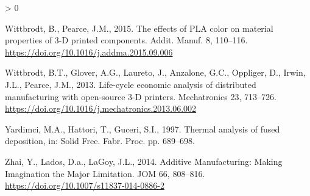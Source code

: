 \documentclass[
]{article}
\newlength{\cslhangindent}
\newenvironment{CSLReferences}[2] %
 {%
  \setlength{\parindent}{0pt}
  \ifodd #1 \everypar{\setlength{\hangindent}{\cslhangindent}}\ignorespaces\fi
  \ifnum #2 > 0
  \setlength{\parskip}{#2\baselineskip}
  \fi
 }%
 {}
\begin{document}
\begin{CSLReferences}{1}{0}
\leavevmode\hypertarget{ref-Wittbrodt2015}{}%
Wittbrodt, B., Pearce, J.M., 2015. {The effects of PLA color on material properties of 3-D printed components}. Addit. Manuf. 8, 110--116. \url{https://doi.org/10.1016/j.addma.2015.09.006}

\leavevmode\hypertarget{ref-Wittbrodt2013}{}%
Wittbrodt, B.T., Glover, A.G., Laureto, J., Anzalone, G.C., Oppliger, D., Irwin, J.L., Pearce, J.M., 2013. {Life-cycle economic analysis of distributed manufacturing with open-source 3-D printers}. Mechatronics 23, 713--726. \url{https://doi.org/10.1016/j.mechatronics.2013.06.002}

\leavevmode\hypertarget{ref-Yardimci1997}{}%
Yardimci, M.A., Hattori, T., Guceri, S.I., 1997. {Thermal analysis of fused deposition}, in: Solid Free. Fabr. Proc. pp. 689--698.

\leavevmode\hypertarget{ref-Zhai2014}{}%
Zhai, Y., Lados, D.a., LaGoy, J.L., 2014. {Additive Manufacturing: Making Imagination the Major Limitation}. JOM 66, 808--816. \url{https://doi.org/10.1007/s11837-014-0886-2}

\end{CSLReferences}
\end{document}
